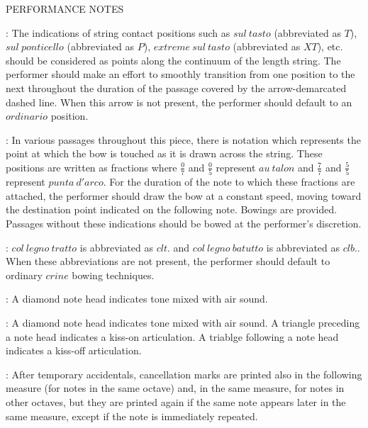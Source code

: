 \documentclass[11pt]{article}
\newcommand*\circled[1]{\tikz[baseline=(char.base)]{
            \node[shape=circle,draw,inner sep=1pt] (char) {#1};}}
\begin{document}
\begin{center}
\huge PERFORMANCE NOTES
\end{center}
\begingroup
\begin{center}

 : The indications of string contact positions such as $sul \ tasto$ (abbreviated as $T$), $sul \ ponticello$ (abbreviated as $P$), $extreme \ sul \ tasto$ (abbreviated as $XT$), etc. should be considered as points along the continuum of the length string. The performer should make an effort to smoothly transition from one position to the next throughout the duration of the passage covered by the arrow-demarcated dashed line. When this arrow is not present, the performer should default to an $ordinario$ position.
\rightskip\leftskip
\phantom{text} \hfill \phantom{()}

 : In various passages throughout this piece, there is notation which represents the point at which the bow is touched as it is drawn across the string. These positions are written as fractions where \( \frac{0}{7} \) and  \( \frac{0}{5} \) represent $au \ talon$ and \( \frac{7}{7} \) and \( \frac{5}{5} \) represent $punta \ d'arco$. For the duration of the note to which these fractions are attached, the performer should draw the bow at a constant speed, moving toward the destination point indicated on the following note. Bowings are provided. Passages without these indications should be bowed at the performer's discretion.
\rightskip\leftskip
\phantom{text} \hfill \phantom{()}

 : \circled{1} $col \ legno \ tratto$ is abbreviated as $clt.$ and \circled{2} $col \ legno \ batutto$ is abbreviated as $clb.$. When these abbreviations are not present, the performer should default to ordinary $crine$ bowing techniques.
\rightskip\leftskip
\phantom{text} \hfill \phantom{()}

 : A diamond note head indicates tone mixed with air sound.
\rightskip\leftskip
\phantom{text} \hfill \phantom{()}

 : \circled{1} A diamond note head indicates tone mixed with air sound. \circled{2} A triangle preceding a note head indicates a kiss-on articulation. \circled{3} A triablge following a note head indicates a kiss-off articulation.
\rightskip\leftskip
\phantom{text} \hfill \phantom{()}

 : After temporary accidentals, cancellation marks are printed also in the following measure (for notes in the same octave) and, in the same measure, for notes in other octaves, but they are printed again if the same note appears later in the same measure, except if the note is immediately repeated.
\rightskip\leftskip
\phantom{text} \hfill \phantom{()}


\end{center}
\end{document}
